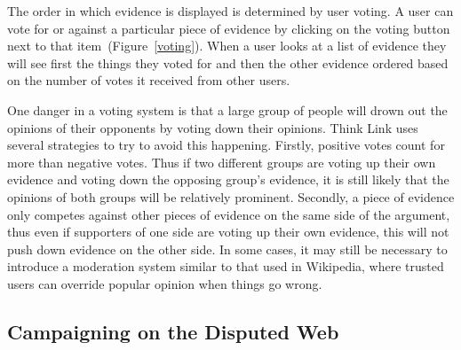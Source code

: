 \documentclass{chi2009}
\newcommand{\todo}[1]{}
\begin{document}
The order in which evidence is displayed is determined by user voting. A user can vote for or against a particular piece of evidence by clicking on the voting button next to that item~(Figure~\ref{voting}). When a user looks at a list of evidence they will see first the things they voted for and then the other evidence ordered based on the number of votes it received from other users.

One danger in a voting system is that a large group of people will drown out the opinions of their opponents by voting down their opinions. Think Link uses several strategies to try to avoid this happening. Firstly, positive votes count for more than negative votes. Thus if two different groups are voting up their own evidence and voting down the opposing group's evidence, it is still likely that the opinions of both groups will be relatively prominent. Secondly, a piece of evidence only competes against other pieces of evidence on the same side of the argument, thus even if supporters of one side are voting up their own evidence, this will not push down evidence on the other side. In some cases, it may still be necessary to introduce a moderation system similar to that used in Wikipedia, where trusted users can override popular opinion when things go wrong.

\todo{Talk about searches}
\todo{Cite work on collaborative filtering}
\todo{Mention the sidebar?}


\subsection{Campaigning on the Disputed Web}
\end{document}
